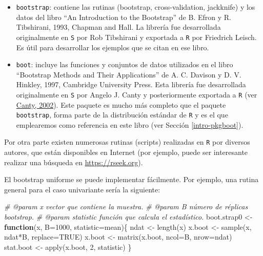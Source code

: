 \documentclass[
]{book}
\newenvironment{Shaded}{\begin{snugshade}}{\end{snugshade}}
\newcommand{\AttributeTok}[1]{\textcolor[rgb]{0.77,0.63,0.00}{#1}}
\newcommand{\CommentTok}[1]{\textcolor[rgb]{0.56,0.35,0.01}{\textit{#1}}}
\newcommand{\ConstantTok}[1]{\textcolor[rgb]{0.00,0.00,0.00}{#1}}
\newcommand{\ControlFlowTok}[1]{\textcolor[rgb]{0.13,0.29,0.53}{\textbf{#1}}}
\newcommand{\DecValTok}[1]{\textcolor[rgb]{0.00,0.00,0.81}{#1}}
\newcommand{\FunctionTok}[1]{\textcolor[rgb]{0.00,0.00,0.00}{#1}}
\newcommand{\NormalTok}[1]{#1}
\newcommand{\OtherTok}[1]{\textcolor[rgb]{0.56,0.35,0.01}{#1}}
\newcommand{\SpecialCharTok}[1]{\textcolor[rgb]{0.00,0.00,0.00}{#1}}
\theoremstyle{break}
\theoremstyle{definition}
\theoremstyle{definition}
\theoremstyle{definition}
\theoremstyle{definition}
\theoremstyle{remark}
\begin{document}
\begin{itemize}
\item
  \texttt{bootstrap}: contiene las rutinas (bootstrap, cross-validation,
  jackknife) y los datos del libro ``An Introduction to the Bootstrap'' de B.
  Efron y R. Tibshirani, 1993, Chapman and Hall. La librería fue
  desarrollada originalmente en \texttt{S} por Rob Tibshirani y exportada a \texttt{R} por
  Friedrich Leisch. Es útil para desarrollar los ejemplos que se citan en
  ese libro.
\item
  \texttt{boot}: incluye las funciones y conjuntos de datos utilizados en el libro
  ``Bootstrap Methods and Their Applications'' de A. C. Davison y D. V. Hinkley, 1997,
  Cambridge University Press. Esta librería fue desarrollada originalmente
  en \texttt{S} por Angelo J. Canty y posteriormente exportada a \texttt{R} (ver \href{http://cran.fhcrc.org/doc/Rnews/Rnews_2002-3.pdf}{Canty, 2002}).
  Este paquete es mucho más completo que el paquete \texttt{bootstrap}, forma parte de la distribución estándar de \texttt{R} y es el que emplearemos como referencia en este libro (ver Sección \ref{intro-pkgboot}).
\end{itemize}

Por otra parte existen numerosas rutinas (scripts) realizadas en \texttt{R} por
diversos autores, que están disponibles en Internet
(por ejemplo, puede ser interesante realizar una búsqueda en
\url{https://rseek.org}).

El bootstrap uniforme se puede implementar fácilmente. Por ejemplo,
una rutina general para el caso univariante sería la siguiente:

\begin{Shaded}
\begin{Highlighting}[]
\CommentTok{\#\textquotesingle{} @param x vector que contiene la muestra.}
\CommentTok{\#\textquotesingle{} @param B número de réplicas bootstrap.}
\CommentTok{\#\textquotesingle{} @param statistic función que calcula el estadístico.}
\NormalTok{boot.strap0 }\OtherTok{\textless{}{-}} \ControlFlowTok{function}\NormalTok{(x, }\AttributeTok{B=}\DecValTok{1000}\NormalTok{, }\AttributeTok{statistic=}\NormalTok{mean)\{}
\NormalTok{  ndat }\OtherTok{\textless{}{-}} \FunctionTok{length}\NormalTok{(x)}
\NormalTok{  x.boot }\OtherTok{\textless{}{-}} \FunctionTok{sample}\NormalTok{(x, ndat}\SpecialCharTok{*}\NormalTok{B, }\AttributeTok{replace=}\ConstantTok{TRUE}\NormalTok{)}
\NormalTok{  x.boot }\OtherTok{\textless{}{-}} \FunctionTok{matrix}\NormalTok{(x.boot, }\AttributeTok{ncol=}\NormalTok{B, }\AttributeTok{nrow=}\NormalTok{ndat)}
\NormalTok{  stat.boot }\OtherTok{\textless{}{-}} \FunctionTok{apply}\NormalTok{(x.boot, }\DecValTok{2}\NormalTok{, statistic)}
\NormalTok{\}}
\end{Highlighting}
\end{Shaded}
\end{document}
